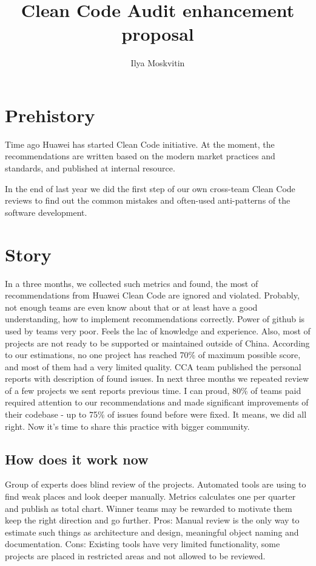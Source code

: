 \documentclass[12pt,oneside]{article}
\title{Clean Code Audit enhancement proposal}
\author{Ilya Moskvitin}
\begin{document}
\raggedbottom
\setlength{\topskip}{6pt}
\setlength{\parindent}{0pt} %
\setlength{\parskip}{6pt} %

\maketitle



\section{Prehistory}
\label{sec:prehistory}
Time ago Huawei has started Clean Code initiative. At the moment, the recommendations are written based on the modern market practices and standards, and published at internal resource.

In the end of last year we did the first step of our own cross-team Clean Code reviews to find out the common mistakes and often-used anti-patterns of the software development.

\section{Story}
\label{sec:story}

In a three months, we collected such metrics and found, the most of recommendations from Huawei Clean Code are ignored and violated. Probably, not enough teams are even know about that or at least have a good understanding, how to implement recommendations correctly. Power of github is used by teams very poor. Feels the lac of knowledge and experience. Also, most of projects are not ready to be supported or maintained outside of China. According to our estimations, no one project has reached 70\% of maximum possible score, and most of them had a very limited quality.
CCA team published the personal reports with description of found issues. In next three months we repeated  review of a few projects we sent reports previous time. I can proud, 80\% of teams paid required attention to our recommendations and made significant improvements of their codebase - up to 75\% of issues found before were fixed. It means, we did all right. Now it's time to share this practice with bigger community.

\subsection{How does it work now}
Group of experts does blind review of the projects. Automated tools are using to find weak places and look deeper manually. Metrics calculates one per quarter and publish as total chart. Winner teams may be rewarded to motivate them keep the right direction and go further.
Pros: Manual review is the only way to estimate such things as architecture and design, meaningful object naming and documentation.
Cons: Existing tools have very limited functionality, some projects are placed in restricted areas and not allowed to be reviewed.
	
\end{document}
